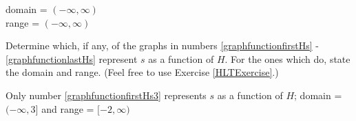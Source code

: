 \documentclass{ximera}
\begin{document}
\begin{question}
\begin{problem}
\begin{center}
\end{center}

\begin{multipleChoice}
    \begin{feedback}
    \begin{solution}
domain = $(-\infty, \infty)$ \\ range = $(-\infty, \infty)$
    \end{solution}
    \end{feedback}
\end{multipleChoice}
\end{problem}

\end{question}

\begin{problem}
Determine which, if any, of the graphs in numbers \ref{graphfunctionfirstHs} - \ref{graphfunctionlastHs} represent $s$ as a function of $H$.  For the ones which do, state the domain and range.   (Feel free to use Exercise \ref{HLTExercise}.)

\begin{solution}
Only number \ref{graphfunctionfirstHs3} represents $s$ as a function of $H$;  domain =  $(-\infty, 3]$  and range =   $[-2, \infty)$
\end{solution}
\end{problem} 
\end{document}
